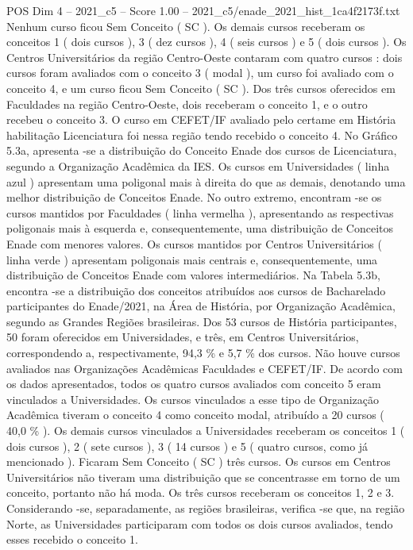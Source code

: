 \begin{textsample}{POS Dim 4 – 2021\_c5 – Score 1.00 – 2021\_c5/enade\_2021\_hist\_1ca4f2173f.txt}
Nenhum curso ficou Sem Conceito ( SC ).
Os demais cursos receberam os conceitos 1 ( dois cursos ), 3 ( dez cursos ), 4 ( seis cursos ) e 5 ( dois cursos ).
Os Centros Universitários da região Centro-Oeste contaram com quatro cursos : dois cursos foram avaliados com o conceito 3 ( modal ), um curso foi avaliado com o conceito 4, e um curso ficou Sem Conceito ( SC ).
Dos três cursos oferecidos em Faculdades na região Centro-Oeste, dois receberam o conceito 1, e o outro recebeu o conceito 3.
O curso em CEFET/IF avaliado pelo certame em História habilitação Licenciatura foi nessa região tendo recebido o conceito 4.
No Gráfico 5.3a, apresenta -se a distribuição do Conceito Enade dos cursos de Licenciatura, segundo a Organização Acadêmica da IES.
Os cursos em Universidades ( linha azul ) apresentam uma poligonal mais à direita do que as demais, denotando uma melhor distribuição de Conceitos Enade.
No outro extremo, encontram -se os cursos mantidos por Faculdades ( linha vermelha ), apresentando as respectivas poligonais mais à esquerda e, consequentemente, uma distribuição de Conceitos Enade com menores valores.
Os cursos mantidos por Centros Universitários ( linha verde ) apresentam poligonais mais centrais e, consequentemente, uma distribuição de Conceitos Enade com valores intermediários.
Na Tabela 5.3b, encontra -se a distribuição dos conceitos atribuídos aos cursos de Bacharelado participantes do Enade/2021, na Área de História, por Organização Acadêmica, segundo as Grandes Regiões brasileiras.
Dos 53 cursos de História participantes, 50 foram oferecidos em Universidades, e três, em Centros Universitários, correspondendo a, respectivamente, 94,3 \% e 5,7 \% dos cursos.
Não houve cursos avaliados nas Organizações Acadêmicas Faculdades e CEFET/IF.
De acordo com os dados apresentados, todos os quatro cursos avaliados com conceito 5 eram vinculados a Universidades.
Os cursos vinculados a esse tipo de Organização Acadêmica tiveram o conceito 4 como conceito modal, atribuído a 20 cursos ( 40,0 \% ).
Os demais cursos vinculados a Universidades receberam os conceitos 1 ( dois cursos ), 2 ( sete cursos ), 3 ( 14 cursos ) e 5 ( quatro cursos, como já mencionado ).
Ficaram Sem Conceito ( SC ) três cursos.
Os cursos em Centros Universitários não tiveram uma distribuição que se concentrasse em torno de um conceito, portanto não há moda.
Os três cursos receberam os conceitos 1, 2 e 3.
Considerando -se, separadamente, as regiões brasileiras, verifica -se que, na região Norte, as Universidades participaram com todos os dois cursos avaliados, tendo esses recebido o conceito 1.

\end{textsample}
